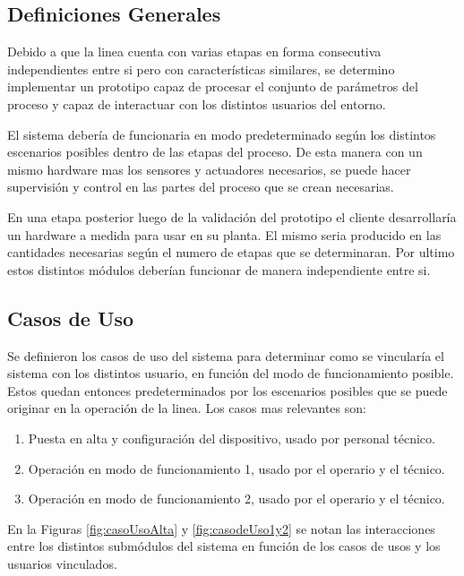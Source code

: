 \subsection{ Definiciones Generales }

Debido a que la linea cuenta con varias etapas en forma consecutiva independientes entre si pero con características similares, se determino implementar un prototipo capaz de procesar el conjunto de parámetros del proceso y capaz de interactuar con los distintos usuarios del entorno.

El sistema debería de funcionaria en modo predeterminado según los distintos escenarios posibles dentro de las etapas del proceso. De esta manera con un mismo hardware mas los sensores y actuadores necesarios, se puede hacer supervisión y control en las partes del proceso que se crean necesarias.

En una etapa posterior luego de la validación del prototipo el cliente desarrollaría un hardware a medida para usar en su planta. El mismo seria producido en las cantidades necesarias según el numero de etapas que se determinaran. Por ultimo estos distintos módulos deberían funcionar de manera independiente entre si.


\subsection{ Casos de Uso }

Se definieron los casos de uso del sistema para determinar como se vincularía el sistema con los distintos usuario, en función del modo de funcionamiento posible. Estos quedan entonces predeterminados por los escenarios posibles que se puede originar en la operación de la linea.
Los casos mas relevantes son:
\begin{enumerate}
	\item Puesta en alta y configuración del dispositivo, usado por personal técnico.
	\item Operación en modo de funcionamiento 1, usado por el operario y el técnico.
	\item Operación en modo de funcionamiento 2, usado por el operario y el técnico.
\end{enumerate}

En la Figuras \ref{fig:casoUsoAlta} y \ref{fig:casodeUso1y2} se notan las interacciones entre los distintos submódulos del sistema en función de los casos de usos y los usuarios vinculados.

